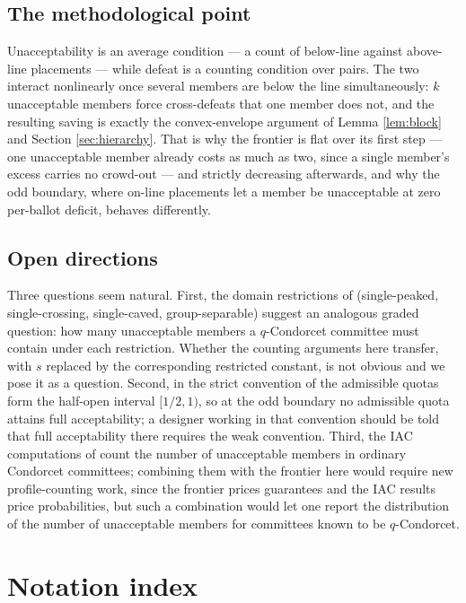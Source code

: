 \documentclass[11pt]{article}
\theoremstyle{plain}
\theoremstyle{definition}
\begin{document}
\subsection{The methodological point}

Unacceptability is an average condition --- a count of below-line against above-line placements --- while defeat is a counting condition over pairs. The two interact nonlinearly once several members are below the line simultaneously: $k$ unacceptable members force cross-defeats that one member does not, and the resulting saving is exactly the convex-envelope argument of Lemma \ref{lem:block} and Section \ref{sec:hierarchy}. That is why the frontier is flat over its first step --- one unacceptable member already costs as much as two, since a single member's excess carries no crowd-out --- and strictly decreasing afterwards, and why the odd boundary, where on-line placements let a member be unacceptable at zero per-ballot deficit, behaves differently.

\subsection{Open directions}

Three questions seem natural. First, the domain restrictions of \cite{DissMahajne2020} (single-peaked, single-crossing, single-caved, group-separable) suggest an analogous graded question: how many unacceptable members a $q$-Condorcet committee must contain under each restriction. Whether the counting arguments here transfer, with $s$ replaced by the corresponding restricted constant, is not obvious and we pose it as a question. Second, in the strict convention of \cite{DissMahajne2020} the admissible quotas form the half-open interval $[1/2,1)$, so at the odd boundary no admissible quota attains full acceptability; a designer working in that convention should be told that full acceptability there requires the weak convention. Third, the IAC computations of \cite{DissMahajne2020} count the number of unacceptable members in ordinary Condorcet committees; combining them with the frontier here would require new profile-counting work, since the frontier prices guarantees and the IAC results price probabilities, but such a combination would let one report the distribution of the number of unacceptable members for committees known to be $q$-Condorcet.

\appendix

\section{Notation index}
\label{app:notation}
\end{document}
